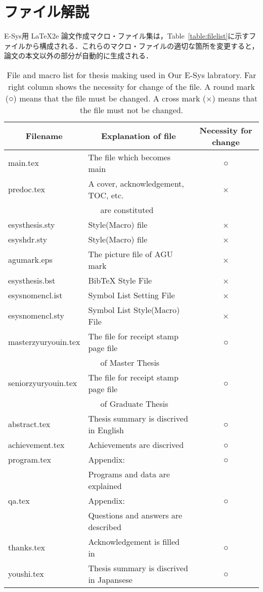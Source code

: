\section{ファイル解説}
E-Sys用 \LaTeX2e 論文作成マクロ・ファイル集は，Table~\ref{table:filelist}に示すファイルから構成される．これらのマクロ・ファイルの適切な箇所を変更すると，論文の本文以外の部分が自動的に生成される．

\begin{table}[t]
\begin{center}
\caption{File and macro list for thesis making used in Our E-Sys labratory. Far right column shows the necessity for change of the file. A round mark (○) means that the file must be changed. A cross mark (×) means that the file must not be changed.}

\begin{tabular}{l|l|c}\hline
\multicolumn{1}{c|}{Filename} & \multicolumn{1}{c|}{Explanation of file} & \multicolumn{1}{c}{Necessity for change}\\ \hline\hline\hline
main.tex & The file which becomes main & ○ \\\hline
predoc.tex & A cover, acknowledgement, TOC, etc. & ×\\ 
 & ~~~are constituted &  \\\hline
esysthesis.sty & Style(Macro) file  & × \\\hline
esyshdr.sty & Style(Macro) file & × \\\hline
agumark.eps & The picture file of AGU mark & × \\\hline
esysthesis.bst & BibTeX Style File & × \\\hline
esysnomencl.ist & Symbol List Setting File & × \\\hline
esysnomencl.sty & Symbol List Style(Macro) File & × \\\hline\hline

masterzyuryouin.tex & The file for receipt stamp page file & ○ \\
 & ~~~of Master Thesis &  \\\hline
seniorzyuryouin.tex & The file for receipt stamp page file & ○\\
 & ~~~of Graduate Thesis &  \\\hline\hline

abstract.tex & Thesis summary is discrived in English & ○ \\\hline
achievement.tex & Achievements are discrived & ○ \\\hline
program.tex & Appendix: &  ○ \\
 & Programs and data are explained &  \\\hline
qa.tex & Appendix: & ○ \\
 & Questions and answers are described &  \\\hline
thanks.tex & Acknowledgement is filled in & ○ \\\hline
youshi.tex & Thesis summary is discrived in Japansese & ○ \\\hline\hline


\end{tabular}
\end{center}
\end{table}
